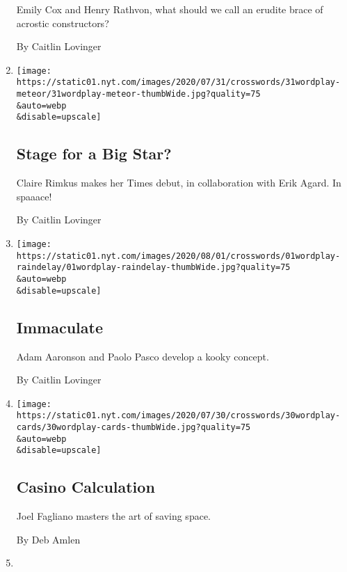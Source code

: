 \begin{enumerate}
  Emily Cox and Henry Rathvon, what should we call an erudite brace of
  acrostic constructors?

  By Caitlin Lovinger
\item
  \href{/2020/07/30/crosswords/daily-puzzle-2020-07-31.html}{}

  \texttt{[image: https://static01.nyt.com/images/2020/07/31/crosswords/31wordplay-meteor/31wordplay-meteor-thumbWide.jpg?quality=75\\\&auto=webp\\\&disable=upscale]}

  \hypertarget{stage-for-a-big-star}{%
  \subsection{Stage for a Big Star?}\label{stage-for-a-big-star}}

  Claire Rimkus makes her Times debut, in collaboration with Erik Agard.
  In spaaace!

  By Caitlin Lovinger
\item
  \href{/2020/07/31/crosswords/daily-puzzle-2020-08-01.html}{}

  \texttt{[image: https://static01.nyt.com/images/2020/08/01/crosswords/01wordplay-raindelay/01wordplay-raindelay-thumbWide.jpg?quality=75\\\&auto=webp\\\&disable=upscale]}

  \hypertarget{immaculate}{%
  \subsection{Immaculate}\label{immaculate}}

  Adam Aaronson and Paolo Pasco develop a kooky concept.

  By Caitlin Lovinger
\item
  \href{/2020/07/29/crosswords/daily-puzzle-2020-07-30.html}{}

  \texttt{[image: https://static01.nyt.com/images/2020/07/30/crosswords/30wordplay-cards/30wordplay-cards-thumbWide.jpg?quality=75\\\&auto=webp\\\&disable=upscale]}

  \hypertarget{casino-calculation}{%
  \subsection{Casino Calculation}\label{casino-calculation}}

  Joel Fagliano masters the art of saving space.

  By Deb Amlen
\item
  \href{/2020/07/28/crosswords/daily-puzzle-2020-07-29.html}{}


\end{enumerate}
